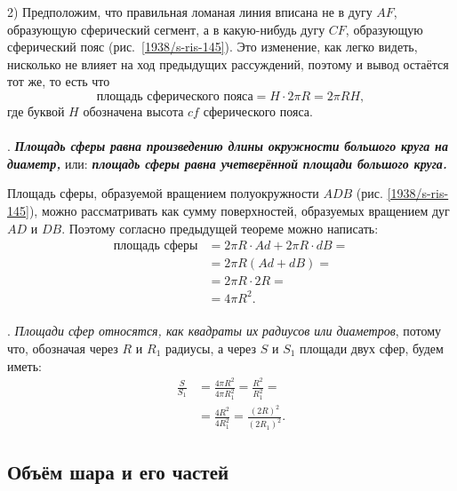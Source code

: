 2) Предположим, что правильная ломаная линия вписана не в дугу $AF$, образующую сферический сегмент, а в какую-нибудь дугу $CF$, образующую сферический пояс (рис.~\ref{1938/s-ris-145}).
Это изменение, как легко видеть, нисколько не влияет на ход предыдущих рассуждений, поэтому и вывод остаётся тот же, то есть что
\[\text{площадь сферического пояса} = H \cdot 2\pi R = 2\pi RH,\]
где буквой $H$ обозначена высота $cf$ сферического пояса.

\paragraph{}\label{1938/s138}
.
\textbf{\emph{Площадь сферы равна произведению длины окружности большого круга на диаметр,}} или: \textbf{\emph{площадь сферы равна учетверённой площади большого круга.}}

Площадь сферы, образуемой вращением полуокружности $ADB$ (рис. \ref{1938/s-ris-145}), можно рассматривать как сумму поверхностей, образуемых вращением дуг $AD$ и $DB$.
Поэтому согласно предыдущей теореме можно написать:
\begin{align*}
\text{площадь сферы} &= 2\pi R\cdot Ad + 2\pi R\cdot dB =
\\
&=2\pi R(Ad + dB) =
\\
&= 2\pi R\cdot 2R = 
\\
&=4\pi R^2.
\end{align*}

\paragraph{}\label{1938/s139}
.
\emph{Площади сфер относятся, как квадраты их радиусов или диаметров}, потому что, обозначая через $R$ и $R_1$ радиусы, а через $S$ и $S_1$ площади двух сфер, будем иметь:
\begin{align*}
\frac{S}{S_1} &= \frac{4\pi R^2}{4\pi R^2_1} =\frac{R^2}{R^2_1} = 
\\&=\frac{4R^2}{4R_1^2} =\frac{(2R)^2}{(2R_1)^2}.
\end{align*}

\subsection*{Объём шара и его частей}

